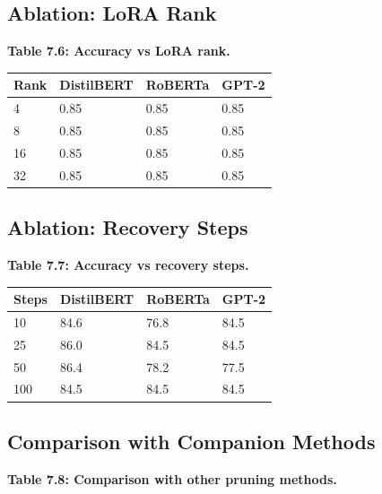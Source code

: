 \subsection{Ablation: LoRA Rank}

\textbf{Table 7.6: Accuracy vs LoRA rank.}

\begin{table}[H]
\centering
\small
\begin{tabular}{llll}
\toprule
\textbf{Rank} & \textbf{DistilBERT} & \textbf{RoBERTa} & \textbf{GPT-2} \\
\midrule
4 & 0.85 & 0.85 & 0.85 \\
8 & 0.85 & 0.85 & 0.85 \\
16 & 0.85 & 0.85 & 0.85 \\
32 & 0.85 & 0.85 & 0.85 \\
\bottomrule
\end{tabular}
\end{table}

\subsection{Ablation: Recovery Steps}

\textbf{Table 7.7: Accuracy vs recovery steps.}

\begin{table}[H]
\centering
\small
\begin{tabular}{llll}
\toprule
\textbf{Steps} & \textbf{DistilBERT} & \textbf{RoBERTa} & \textbf{GPT-2} \\
\midrule
10 & 84.6 & 76.8 & 84.5 \\
25 & 86.0 & 84.5 & 84.5 \\
50 & 86.4 & 78.2 & 77.5 \\
100 & 84.5 & 84.5 & 84.5 \\
\bottomrule
\end{tabular}
\end{table}

\subsection{Comparison with Companion Methods}

\textbf{Table 7.8: Comparison with other pruning methods.}

